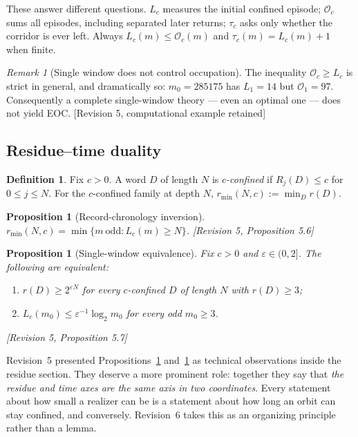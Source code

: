 \documentclass[11pt]{article}
\theoremstyle{plain}
\newtheorem{proposition}[theorem]{Proposition}
\theoremstyle{definition}
\newtheorem{definition}[theorem]{Definition}
\theoremstyle{remark}
\newtheorem{remark}[theorem]{Remark}
\newcommand{\Occ}{\mathcal{O}}
\newcommand{\rmin}{r_{\min}}
\newcommand{\status}[1]{\textsf{\footnotesize[#1]}}
\begin{document}
These answer different questions. $L_c$ measures the initial confined episode; $\Occ_c$ sums all
episodes, including separated later returns; $\tau_c$ asks only whether the corridor is ever left.
Always $L_c(m)\le\Occ_c(m)$ and $\tau_c(m)=L_c(m)+1$ when finite.

\begin{remark}[Single window does not control occupation]\label{rem:LvsO}
The inequality $\Occ_c\ge L_c$ is strict in general, and dramatically so: $m_0=285175$ has
$L_1=14$ but $\Occ_1=97$. Consequently a complete single-window theory --- even an optimal one ---
does not yield EOC. \status{Revision 5, computational example retained}
\end{remark}

\subsection{Residue--time duality}\label{sec:duality}

\begin{definition}
Fix $c>0$. A word $D$ of length $N$ is \emph{$c$-confined} if $R_j(D)\le c$ for $0\le j\le N$. For
the $c$-confined family at depth $N$, $\rmin(N,c):=\min_D r(D)$.
\end{definition}

\begin{proposition}[Record-chronology inversion]\label{prop:inversion}
$\rmin(N,c)=\min\{m\ \text{odd}: L_c(m)\ge N\}$. \status{Revision 5, Proposition 5.6}
\end{proposition}

\begin{proposition}[Single-window equivalence]\label{prop:window}
Fix $c>0$ and $\varepsilon\in(0,2]$. The following are equivalent:
\begin{enumerate}[label=(\roman*),leftmargin=2em]
\item $r(D)\ge2^{\varepsilon N}$ for every $c$-confined $D$ of length $N$ with $r(D)\ge3$;
\item $L_c(m_0)\le\varepsilon^{-1}\log_2 m_0$ for every odd $m_0\ge3$.
\end{enumerate}
\status{Revision 5, Proposition 5.7}
\end{proposition}

Revision~5 presented Propositions~\ref{prop:inversion} and~\ref{prop:window} as technical
observations inside the residue section. They deserve a more prominent role: together they say that
\emph{the residue and time axes are the same axis in two coordinates}. Every statement about how
small a realizer can be is a statement about how long an orbit can stay confined, and conversely.
Revision~6 takes this as an organizing principle rather than a lemma.
\end{document}
